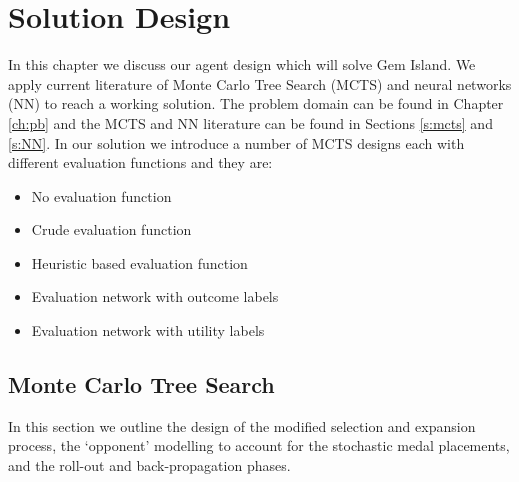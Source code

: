 \documentclass{bhamthesis}
\theoremstyle{definition}
\begin{document}
\chapter{Solution Design}\label{ch:solD}
In this chapter we discuss our agent design which will solve Gem Island. We apply current literature of Monte Carlo Tree Search (MCTS) and neural networks (NN) to reach a working solution. The problem domain can be found in Chapter \ref{ch:pb} and the MCTS and NN literature can be found in Sections \ref{s:mcts} and \ref{s:NN}. In our solution we introduce a number of MCTS designs each with different evaluation functions and they are:

\begin{itemize}
	\item No evaluation function
	\item Crude evaluation function
	\item Heuristic based evaluation function
	\item Evaluation network with outcome labels
	\item Evaluation network with utility labels
\end{itemize}

\section{Monte Carlo Tree Search}\label{s:mctsDesign}
In this section we outline the design of the modified selection and expansion process, the `opponent' modelling to account for the stochastic medal placements, and the roll-out and back-propagation phases.
\end{document}
